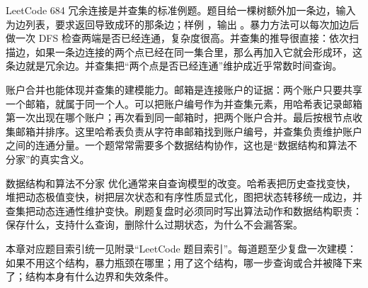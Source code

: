 LeetCode 684 冗余连接是并查集的标准例题。题目给一棵树额外加一条边，输入为边列表，要求返回导致成环的那条边；样例 ，输出 \code{[2,3]}。暴力方法可以每次加边后做一次 DFS 检查两端是否已经连通，复杂度很高。并查集的推导很直接：依次扫描边，如果一条边连接的两个点已经在同一集合里，那么再加入它就会形成环，这条边就是冗余边。并查集把“两个点是否已经连通”维护成近乎常数时间查询。

账户合并也能体现并查集的建模能力。邮箱是连接账户的证据：两个账户只要共享一个邮箱，就属于同一个人。可以把账户编号作为并查集元素，用哈希表记录邮箱第一次出现在哪个账户；再次看到同一邮箱时，把两个账户合并。最后按根节点收集邮箱并排序。这里哈希表负责从字符串邮箱找到账户编号，并查集负责维护账户之间的连通分量。一个题常常需要多个数据结构协作，这也是“数据结构和算法不分家”的真实含义。

\begin{principlebox}{数据结构和算法不分家}
优化通常来自查询模型的改变。哈希表把历史查找变快，堆把动态极值变快，树把层次状态和有序性质显式化，图把状态转移统一成边，并查集把动态连通性维护变快。刷题复盘时必须同时写出算法动作和数据结构职责：保存什么，支持什么查询，删除什么过期状态，为什么不会漏答案。
\end{principlebox}

本章对应题目索引统一见附录“LeetCode 题目索引”。每道题至少复盘一次建模：如果不用这个结构，暴力瓶颈在哪里；用了这个结构，哪一步查询或合并被降下来了；结构本身有什么边界和失效条件。




